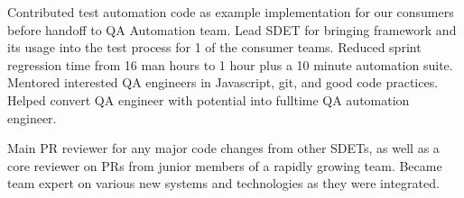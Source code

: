 \begin{cventries}
{\begin{cvitems}
        \item {Contributed test automation code as example implementation for our consumers before handoff to QA Automation team. Lead SDET for bringing framework and its usage into the test process for 1 of the consumer teams. Reduced sprint regression time from 16 man hours to 1 hour plus a 10 minute automation suite. Mentored interested QA engineers in Javascript, git, and good code practices. Helped convert QA engineer with potential into fulltime QA automation engineer.}
		\item {Main PR reviewer for any major code changes from other SDETs, as well as a core reviewer on PRs from junior members of a rapidly growing team. Became team expert on various new systems and technologies as they were integrated.}
      \end{cvitems}
    }


\end{cventries}
